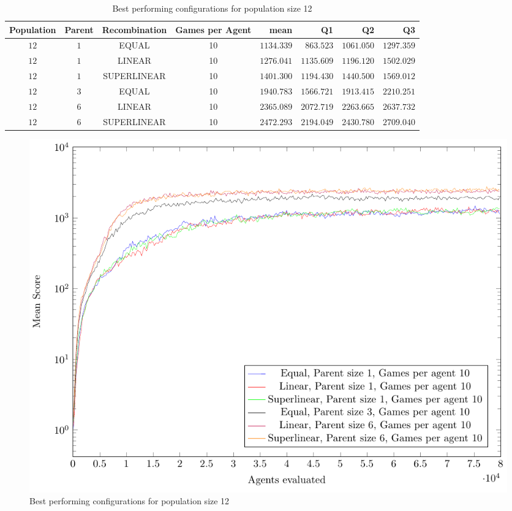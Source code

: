\begin{table}[H]
\centering
\small
\begin{tabular}{c c c c r r r r}
Population & Parent & Recombination & Games per Agent & mean & Q1 & Q2 & Q3\\
\hline
$12$ & $1$ & EQUAL & 10 & $1134.339$ & $863.523$ & $1061.050$ & $1297.359$\\
$12$ & $1$ & LINEAR & 10 & $1276.041$ & $1135.609$ & $1196.120$ & $1502.029$\\
$12$ & $1$ & SUPERLINEAR & 10 & $1401.300$ & $1194.430$ & $1440.500$ & $1569.012$\\
$12$ & $3$ & EQUAL & 10 & $1940.783$ & $1566.721$ & $1913.415$ & $2210.251$\\
$12$ & $6$ & LINEAR & 10 & $2365.089$ & $2072.719$ & $2263.665$ & $2637.732$\\
$12$ & $6$ & SUPERLINEAR & 10 & $2472.293$ & $2194.049$ & $2430.780$ & $2709.040$\\
\end{tabular}
\caption{Best performing configurations for population size 12}
\end{table}

\begin{figure}[H]
\centering
\includegraphics[scale=1]{data/cma_population_offspring/bestofeach_population/12x/PlotFile.pdf}
\caption{Best performing configurations for population size 12}
\end{figure}

\clearpage

